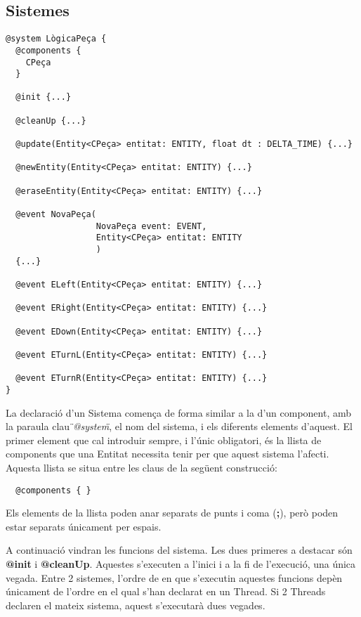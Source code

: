\subsection{Sistemes}

\begin{verbatim}
@system LògicaPeça {
  @components {
    CPeça
  }
  
  @init {...}
  
  @cleanUp {...}
  
  @update(Entity<CPeça> entitat: ENTITY, float dt : DELTA_TIME) {...}
  
  @newEntity(Entity<CPeça> entitat: ENTITY) {...}
  
  @eraseEntity(Entity<CPeça> entitat: ENTITY) {...}
  
  @event NovaPeça(
                  NovaPeça event: EVENT, 
                  Entity<CPeça> entitat: ENTITY
                  )
  {...}
  
  @event ELeft(Entity<CPeça> entitat: ENTITY) {...}
  
  @event ERight(Entity<CPeça> entitat: ENTITY) {...}
  
  @event EDown(Entity<CPeça> entitat: ENTITY) {...}
  
  @event ETurnL(Entity<CPeça> entitat: ENTITY) {...}
  
  @event ETurnR(Entity<CPeça> entitat: ENTITY) {...}
}
\end{verbatim}

La declaració d'un Sistema comença de forma similar a la d'un component, amb la paraula clau {\em \"{}@system\"{}}, el nom del sistema, i els diferents elements d'aquest. El primer element que cal introduir sempre, i l'únic obligatori, és la llista de components que una Entitat necessita tenir per que aquest sistema l'afecti. Aquesta llista se situa entre les claus de la següent construcció:

\begin{verbatim}
  @components { }
\end{verbatim}

Els elements de la llista poden anar separats de punts i coma ({\bf ;}), però poden estar separats únicament per espais.

A continuació vindran les funcions del sistema. Les dues primeres a destacar són {\bf @init} i {\bf @cleanUp}. Aquestes s'executen a l'inici i a la fi de l'execució, una única vegada. Entre 2 sistemes, l'ordre de en que s'executin aquestes funcions depèn únicament de l'ordre en el qual s'han declarat en un Thread. Si 2 Threads declaren el mateix sistema, aquest s'executarà dues vegades.

